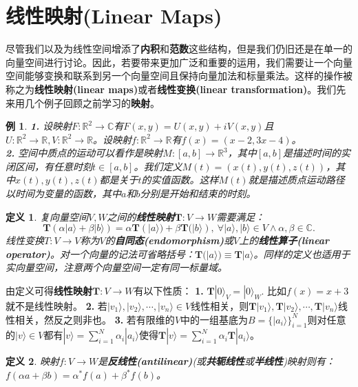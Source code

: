 \documentclass[mathserif,hyperref,UTF8,openany,b5paper]{ctexbook}
\newtheorem{exmp}{例}[section]
\newtheorem{defn}{定义}[section]
\begin{document}
\section{线性映射(Linear Maps)}
尽管我们以及为线性空间增添了\textbf{内积}和\textbf{范数}这些结构，但是我们仍旧还是在单一的向量空间进行讨论。因此，若要带来更加广泛和重要的运用，我们需要让一个向量空间能够变换和联系到另一个向量空间且保持向量加法和标量乘法。这样的操作被称之为\textbf{线性映射(linear maps)}或者\textbf{线性变换(linear transformation)}。我们先来用几个例子回顾之前学习的\textbf{映射}。
\begin{exmp}
\textbf{1.} 设映射$F:\mathbb{R}^2\xrightarrow{}\mathbb{C}$有$F(x,y)=U(x,y)+iV(x,y)$且$U:\mathbb{R}^2\xrightarrow{}\mathbb{R},V:\mathbb{R}^2\xrightarrow{}\mathbb{R}$。设映射$f:\mathbb{R}^2\xrightarrow{}\mathbb{R}$有$f(x)=(x-2,3x-4)$。\\
\textbf{2.} 空间中质点的运动可以看作是映射$
M:[a,b]\xrightarrow{}\mathbb{R}^3$，其中$[a,b]$是描述时间的实闭区间，有任意时刻$t\in[a, b]$。我们定义$M(t)=(x(t),y(t),z (t))$，其中$x(t),y(t),z (t)$都是关于$t$的实值函数。这样$M(t)$就是描述质点运动路径以时间为变量的函数，其中$a$和$b$分别是开始和结束的时刻。
\end{exmp}
\begin{defn}
复向量空间$V,W$之间的\textbf{线性映射}$\mathbf{T}:V\xrightarrow{}W$需要满足：
\begin{equation}
    \mathbf{T}(\alpha|a\rangle+\beta|b\rangle)=\alpha\mathbf{T}(|a\rangle)+\beta\mathbf{T}(|b\rangle),\ \forall |a\rangle,|b\rangle\in V \land \alpha,\beta \in \mathbb{C}.
\end{equation}
线性变换$T: V\xrightarrow{}V$称为$V$的\textbf{自同态(endomorphism)}或$V$上的\textbf{线性算子(linear operator)}。对一个向量的记法可省略括号：$\mathbf{T}(|a\rangle)\equiv\mathbf{T}|a \rangle$。同样的定义也适用于实向量空间，注意两个向量空间一定有同一标量域。
\end{defn}

由定义可得\textbf{线性映射}$\mathbf{T}:V\xrightarrow{}W$有以下性质：
\textbf{1.} $\mathbf{T}|0\rangle_V=|0\rangle_W.$ 比如$f(x)=x+3$就不是线性映射。
\textbf{2.} 若$|v_1\rangle,|v_2\rangle,\cdots,|v_n\rangle\in V$线性相关，则$\mathbf{T}|v_1\rangle,\mathbf{T}|v_2\rangle,\cdots,\mathbf{T}|v_n\rangle$线性相关，然反之则非也。
\textbf{3.} 若有限维的$V$中的一组基底为$B=\{|a_i\rangle\}^N_{i=1}$则对任意的$|v\rangle \in V$都有$|v\rangle = \sum^N_{i=1}\alpha_i|a_i\rangle$使得$\mathbf{T}|v\rangle =\sum^N_{i=1}\alpha_i\mathbf{T}|a_i\rangle$。
\begin{defn}
映射$f:V\xrightarrow{}W$是\textbf{反线性(antilinear)}(或\textbf{共轭线性}或\textbf{半线性})映射则有：$f(\alpha a+\beta b)=\alpha^*f(a)+\beta^*f(b)$。
\end{defn}
\end{document}
